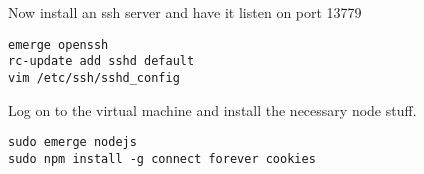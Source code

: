 \documentclass[a4paper]{book}
\begin{document}
Now install an ssh server and have it listen on port 13779
\begin{verbatim}
emerge openssh
rc-update add sshd default
vim /etc/ssh/sshd_config
\end{verbatim}

Log on to the virtual machine and install the necessary node stuff.
\begin{verbatim}
sudo emerge nodejs
sudo npm install -g connect forever cookies
\end{verbatim}
\end{document}
